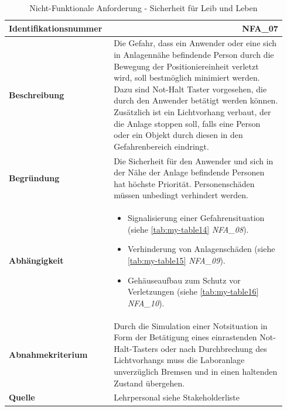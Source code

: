 \documentclass[../../../Bachelorarbeit.tex]{subfiles}
\begin{document}
\begin{table}[H]
    \centering
    \begin{tabular}{ p{0.34\linewidth}  p{0.6\linewidth} }
        \hline
        \textbf{Identifikationsnummer}  & \multicolumn{1}{r}{NFA\_07} \\ \hline
        \textbf{Beschreibung}           & Die Gefahr, dass ein Anwender oder eine sich in Anlagennähe befindende Person durch die Bewegung der Positioniereinheit verletzt wird, soll bestmöglich minimiert werden. Dazu sind Not-Halt Taster vorgesehen, die durch den Anwender betätigt werden können. Zusätzlich ist ein Lichtvorhang verbaut, der die Anlage stoppen soll, falls eine Person oder ein Objekt durch diesen in den Gefahrenbereich eindringt. \\
        \textbf{Begründung}             & Die Sicherheit für den Anwender und sich in der Nähe der Anlage befindende Personen hat höchste Priorität. Personenschäden müssen unbedingt verhindert werden. \\
        \textbf{Abhängigkeit}           &   {\begin{itemize}[noitemsep,topsep=0pt,parsep=0pt,partopsep=0pt,leftmargin=*]
                                                \item Signalisierung einer Gefahrensituation (siehe \autoref{tab:my-table14} \textit{NFA\_08}).
                                                \item Verhinderung von Anlagenschäden (siehe \autoref{tab:my-table15} \textit{NFA\_09}).
                                                \item Gehäuseaufbau zum Schutz vor Verletzungen (siehe \autoref{tab:my-table16} \textit{NFA\_10}).
                                            \end{itemize}} \\
        \textbf{Abnahmekriterium}       & Durch die Simulation einer Notsituation in Form der Betätigung eines einrastenden Not-Halt-Tasters oder nach Durchbrechung des Lichtvorhangs muss die Laboranlage unverzüglich Bremsen und in einen haltenden Zustand übergehen. \\
        \textbf{Quelle}                 & Lehrpersonal siehe Stakeholderliste \\ \hline
    \end{tabular}
    \caption[\acs{nfa} - Sicherheit für Leib und Leben]{Nicht-Funktionale Anforderung - Sicherheit für Leib und Leben}
    \label{tab:my-table13}
\end{table}
\end{document}
